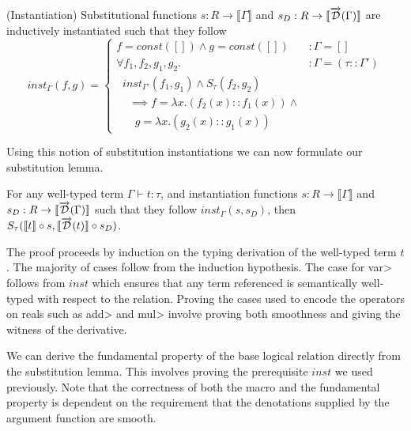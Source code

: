   \begin{definition}(Instantiation)
    Substitutional functions $s : R \rightarrow \llbracket \Gamma \rrbracket$ and $s_D : R \rightarrow \llbracket \overrightarrow{\mathcal{D}}(\Gamma) \rrbracket$ are inductively instantiated such that they follow
    \begin{equation}
      inst_\Gamma(f, g) =
        \left\{
          \begin{array}{ll}
            f = const([]) \wedge g = const([])
              & : \Gamma = [] \\
            \forall f_1, f_2, g_1, g_2.
              & : \Gamma = (\tau :: \Gamma') \\
              \;\;inst_{\Gamma'}(f_1, g_1) \wedge S_\tau(f_2, g_2) \\
              \;\;\;\; \implies f = \lambda x. (f_2(x) :: f_1(x)) \wedge \\
              \;\;\;\;\;\; g = \lambda x. (g_2(x) :: g_1(x))
          \end{array}
        \right.
    \label{eqn:inst_base}
    \end{equation}
  \end{definition}

  Using this notion of substitution instantiations we can now formulate our substitution lemma.

  \begin{lemma}[Substitution]\label{thm:substitution_lemma}
    For any well-typed term $\Gamma \vdash t : \tau$, and instantiation functions $s : R \rightarrow \llbracket \Gamma \rrbracket$ and $s_D : R \rightarrow \llbracket \overrightarrow{\mathcal{D}}(\Gamma) \rrbracket$ such that they follow $inst_\Gamma(s, s_D)$, then $S_\tau(\llbracket t\rrbracket \circ s, \llbracket \overrightarrow{\mathcal{D}}(t)\rrbracket \circ s_D)$.
  \end{lemma}

  The proof proceeds by induction on the typing derivation of the well-typed term $t$.
  The majority of cases follow from the induction hypothesis.
  The case for \<var> follows from $inst$ which ensures that any term referenced is semantically well-typed with respect to the relation.
  Proving the cases used to encode the operators on reals such as \<add> and \<mul> involve proving both smoothness and giving the witness of the derivative.


  We can derive the fundamental property of the base logical relation directly from the substitution lemma.
  This involves proving the prerequisite $inst$ we used previously.
  Note that the correctness of both the macro and the fundamental property is dependent on the requirement that the denotations supplied by the argument function are smooth.

